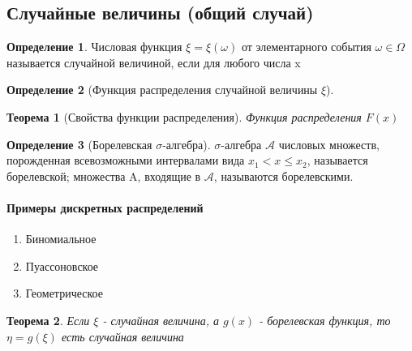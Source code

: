 \documentclass[a4paper]{article}
\newtheorem{theorem}{Теорема}[section]
\theoremstyle{definition}
\newtheorem*{definition}{Определение}
\theoremstyle{remark}
\begin{document}
\subsection{Случайные величины (общий случай)}
\begin{definition}
    Числовая функция $\xi = \xi (\omega)$ от элементарного события $\omega \in \Omega$ называется случайной величиной, если для любого числа x
\end{definition}
\begin{definition}[Функция распределения случайной величины $\xi$]
    
\end{definition}
\begin{theorem}[Свойства функции распределения]
    Функция распределения $F(x)$
\end{theorem}
\begin{definition}[Борелевская $\sigma$-алгебра]
    $\sigma$-алгебра $\mathcal{A}$ числовых множеств, порожденная всевозможными интервалами вида $x_1<x\leq x_2$, называется борелевской; множества A, входящие в $\mathcal{A}$, называются борелевскими.
\end{definition}
\paragraph*{Примеры дискретных распределений}
\begin{enumerate}
    \item Биномиальное
    \item Пуассоновское
    \item Геометрическое
\end{enumerate}
\begin{theorem}
    Если $\xi$ - случайная величина, а $g(x)$ - борелевская функция, то $\eta = g(\xi)$ есть случайная величина
\end{theorem}
\end{document}
